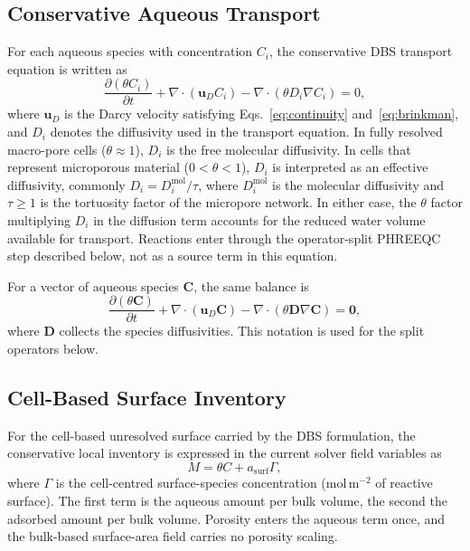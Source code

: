 \subsection{Conservative Aqueous Transport}

For each aqueous species with concentration $C_i$, the conservative DBS
transport equation is written as
\begin{equation}
\frac{\partial (\theta C_i)}{\partial t}
+ \nabla \cdot (\bm{u}_D C_i)
- \nabla \cdot (\theta D_i \nabla C_i) = 0,
\end{equation}
where $\bm{u}_D$ is the Darcy velocity satisfying
Eqs.~\eqref{eq:continuity} and~\eqref{eq:brinkman}, and $D_i$ denotes the
diffusivity used in the transport equation. In fully resolved macro-pore cells
($\theta \approx 1$), $D_i$ is the free molecular diffusivity. In cells that
represent microporous material ($0 < \theta < 1$), $D_i$ is interpreted as an
effective diffusivity, commonly $D_i = D_i^{\mathrm{mol}}/\tau$, where
$D_i^{\mathrm{mol}}$ is the molecular diffusivity and $\tau \geq 1$ is the
tortuosity factor of the micropore network. In either case, the $\theta$ factor
multiplying $D_i$ in the diffusion term accounts for the reduced water volume
available for transport. Reactions enter through the operator-split PHREEQC
step described below, not as a source term in this equation.

For a vector of aqueous species $\bm{C}$, the same balance is
\begin{equation}
\frac{\partial (\theta \bm{C})}{\partial t}
+ \nabla \cdot (\bm{u}_D \bm{C})
- \nabla \cdot (\theta \bm{D} \nabla \bm{C}) = \bm{0},
\end{equation}
where $\bm{D}$ collects the species diffusivities. This notation is used for
the split operators below.

\subsection{Cell-Based Surface Inventory}

For the cell-based unresolved surface carried by the DBS formulation, the
conservative local inventory is expressed
in the current solver field variables as
\begin{equation}
M = \theta C + a_{\mathrm{surf}}\Gamma,
\label{eq:inventory}
\end{equation}
where $\Gamma$ is the cell-centred surface-species concentration
(mol\,m$^{-2}$ of reactive surface). The first term is the aqueous amount per
bulk volume, the second the adsorbed amount per bulk volume. Porosity enters
the aqueous term once, and the bulk-based surface-area field carries no
porosity scaling.

